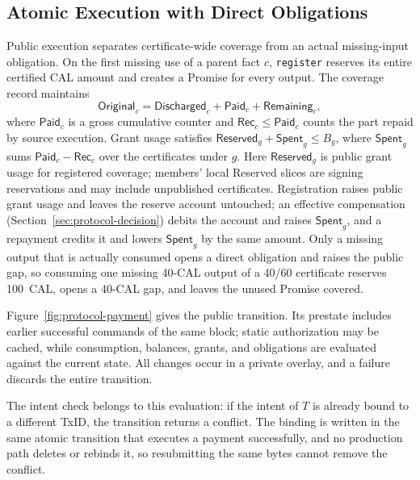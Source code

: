 \subsection{Atomic Execution with Direct Obligations}
\label{sec:protocol-execution}

Public execution separates certificate-wide coverage from an actual missing-input obligation. On the first missing use of a parent fact $c$, \texttt{register} reserves its entire certified CAL amount and creates a Promise for every output. The coverage record maintains
\begin{equation}
  \mathsf{Original}_c=
  \mathsf{Discharged}_c+\mathsf{Paid}_c+\mathsf{Remaining}_c,
  \label{eq:protocol-coverage}
\end{equation}
where $\mathsf{Paid}_c$ is a gross cumulative counter and $\mathsf{Rec}_c\le\mathsf{Paid}_c$ counts the part repaid by source execution. Grant usage satisfies $\mathsf{Reserved}_g+\mathsf{Spent}_g\le B_g$, where $\mathsf{Spent}_g$ sums $\mathsf{Paid}_c-\mathsf{Rec}_c$ over the certificates under $g$. Here $\mathsf{Reserved}_g$ is public grant usage for registered coverage; members' local Reserved slices are signing reservations and may include unpublished certificates. Registration raises public grant usage and leaves the reserve account untouched; an effective compensation (Section~\ref{sec:protocol-decision}) debits the account and raises $\mathsf{Spent}_g$, and a repayment credits it and lowers $\mathsf{Spent}_g$ by the same amount. Only a missing output that is actually consumed opens a direct obligation and raises the public gap, so consuming one missing 40-CAL output of a 40/60 certificate reserves 100~CAL, opens a 40-CAL gap, and leaves the unused Promise covered.

Figure~\ref{fig:protocol-payment} gives the public transition. Its prestate includes earlier successful commands of the same block; static authorization may be cached, while consumption, balances, grants, and obligations are evaluated against the current state. All changes occur in a private overlay, and a failure discards the entire transition.

The intent check belongs to this evaluation: if the intent of $T$ is already bound to a different TxID, the transition returns a conflict. The binding is written in the same atomic transition that executes a payment successfully, and no production path deletes or rebinds it, so resubmitting the same bytes cannot remove the conflict.

